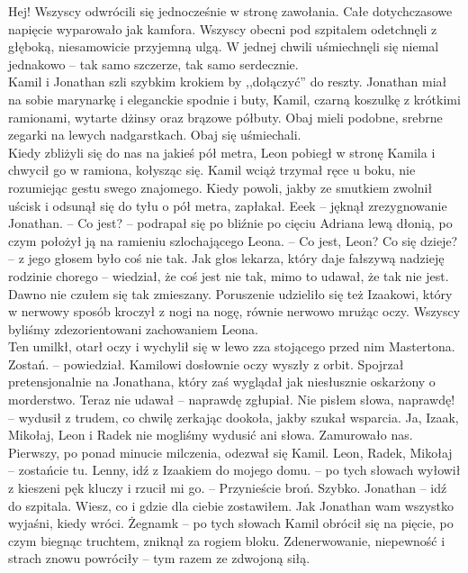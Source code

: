 \documentclass[../MAIN.tex]{subfiles}
\begin{document}
\xx Hej!
\qd
Wszyscy odwrócili się jednocześnie w stronę zawołania.
Całe dotychczasowe napięcie wyparowało jak kamfora. Wszyscy obecni pod szpitalem odetchnęli z głęboką, niesamowicie przyjemną ulgą. W jednej chwili uśmiechnęli się niemal jednakowo -- tak samo szczerze, tak samo serdecznie.\\
Kamil i Jonathan szli szybkim krokiem by ,,dołączyć'' do reszty. Jonathan miał na sobie marynarkę i eleganckie spodnie i buty, Kamil, czarną koszulkę z krótkimi ramionami, wytarte dżinsy oraz brązowe półbuty. Obaj mieli podobne, srebrne zegarki na lewych nadgarstkach. Obaj się uśmiechali.\\
Kiedy zbliżyli się do nas na jakieś pół metra, Leon pobiegł w stronę Kamila i chwycił go w ramiona, kołysząc się. Kamil wciąż trzymał ręce u boku, nie rozumiejąc gestu swego znajomego. Kiedy powoli, jakby ze smutkiem zwolnił uścisk i odsunął się do tyłu o pół metra, zapłakał.
\sx Eee\3k -- jęknął zrezygnowanie Jonathan. -- Co jest? -- podrapał się po bliźnie po cięciu Adriana lewą dłonią, po czym położył ją na ramieniu szlochającego Leona. -- Co jest, Leon? Co się dzieje? -- z jego głosem było coś nie tak.
\qd
Jak głos lekarza, który daje fałszywą nadzieję rodzinie chorego -- wiedział, że coś jest nie tak, mimo to udawał, że tak nie jest.\\
Dawno nie czułem się tak zmieszany. Poruszenie udzieliło się też Izaakowi, który w nerwowy sposób kroczył z nogi na nogę, równie nerwowo mrużąc oczy. Wszyscy byliśmy zdezorientowani zachowaniem Leona.\\
Ten umilkł, otarł oczy i wychylił się w lewo zza stojącego przed nim Mastertona.
\sx Zostań. -- powiedział.
\qd
Kamilowi dosłownie oczy wyszły z orbit. Spojrzał pretensjonalnie na Jonathana, który zaś wyglądał jak niesłusznie oskarżony o morderstwo. Teraz nie udawał -- naprawdę zgłupiał.
\sx Nie pisłem słowa, naprawdę! -- wydusił z trudem, co chwilę zerkając dookoła, jakby szukał wsparcia.
\qd
Ja, Izaak, Mikołaj, Leon i Radek nie mogliśmy wydusić ani słowa. Zamurowało nas. Pierwszy, po ponad minucie milczenia, odezwał się Kamil.
\sx Leon, Radek, Mikołaj -- zostańcie tu. Lenny, idź z Izaakiem do mojego domu. -- po tych słowach wyłowił z kieszeni pęk kluczy i rzucił mi go. -- Przynieście broń. Szybko. Jonathan -- idź do szpitala. Wiesz, co i gdzie dla ciebie zostawiłem. Ja\3k Jonathan wam wszystko wyjaśni, kiedy wróci. Żegnam\3k -- po tych słowach Kamil obrócił się na pięcie, po czym biegnąc truchtem, zniknął za rogiem bloku. 
\qd
Zdenerwowanie, niepewność i strach znowu powróciły -- tym razem ze zdwojoną siłą.
\end{document}
